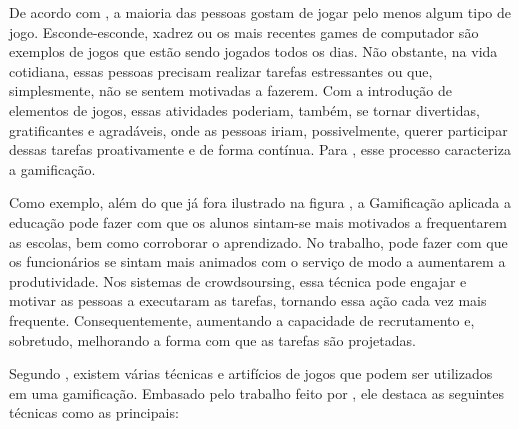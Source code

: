 	
De acordo com \cite{hagglund2012}, a maioria das pessoas gostam de jogar pelo menos algum tipo de jogo. Esconde-esconde, xadrez ou os mais recentes games de computador são exemplos de jogos que estão sendo jogados todos os dias. Não obstante, na vida cotidiana, essas pessoas precisam realizar tarefas estressantes ou que, simplesmente, não se sentem motivadas a fazerem. Com a introdução de elementos de jogos, essas atividades poderiam, também, se tornar divertidas, gratificantes e agradáveis, onde as pessoas iriam, possivelmente, querer participar dessas tarefas proativamente e de forma contínua. Para  \cite{hagglund2012}, esse processo caracteriza a  gamificação.  
	
Como exemplo, além do que já fora ilustrado na figura , a Gamificação aplicada a  educação  pode fazer com que os alunos sintam-se mais motivados a frequentarem as escolas, bem como corroborar o aprendizado. No trabalho, pode fazer com que os funcionários se sintam mais animados com o serviço de modo a aumentarem a produtividade.  Nos sistemas de crowdsoursing, essa técnica pode engajar e motivar as pessoas a executaram as tarefas, tornando essa ação cada vez mais frequente. Consequentemente, aumentando a capacidade de recrutamento e, sobretudo, melhorando a forma com que as tarefas são projetadas.          

Segundo \cite{pereira2011}, existem várias técnicas e artifícios de jogos que podem ser utilizados em uma gamificação. Embasado pelo trabalho feito por \cite{lands2011}, ele destaca as seguintes técnicas como as principais:

